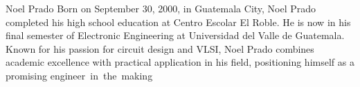 \begin{IEEEbiography}{Noel Prado}
    Born on September 30, 2000, in Guatemala City, Noel Prado completed his high school education at Centro Escolar El Roble. He is now in his final semester of Electronic Engineering at Universidad del Valle de Guatemala. Known for his passion for circuit design and VLSI, Noel Prado combines academic excellence with practical application in his field, positioning himself as a promising engineer in the making
\end{IEEEbiography}